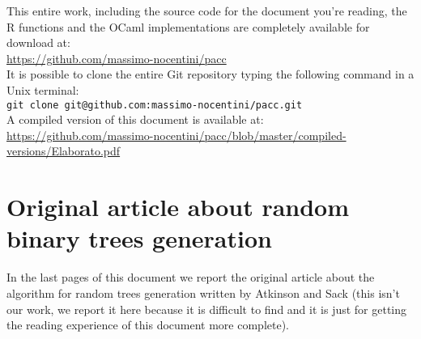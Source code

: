 \documentclass[twoside,openright,titlepage,fleqn,
	headinclude,11pt,a4paper,BCOR5mm,footinclude
	]{scrbook}
\begin{document}
This entire work, including the source code for the document you're
reading, the R functions and the OCaml implementations are completely
available for download at:\\
\href{https://github.com/massimo-nocentini/pacc}{https://github.com/massimo-nocentini/pacc}\\
It is possible to clone the entire Git repository typing the following
command in a Unix terminal:\\
\texttt{git clone git@github.com:massimo-nocentini/pacc.git}\\
A compiled version of this document is available at: \\
\href{https://github.com/massimo-nocentini/pacc/blob/master/compiled-versions/Elaborato.pdf}{https://github.com/massimo-nocentini/pacc/blob/master/compiled-versions/Elaborato.pdf}

\section{Original article about random binary trees generation}

In the last pages of this document we report the original article
about the algorithm for random trees generation written by Atkinson
and Sack (this isn't our work, we report it here because it is
difficult to find and it is just for getting the reading experience of
this document more complete).



% 

% 

\newpage


\end{document}
